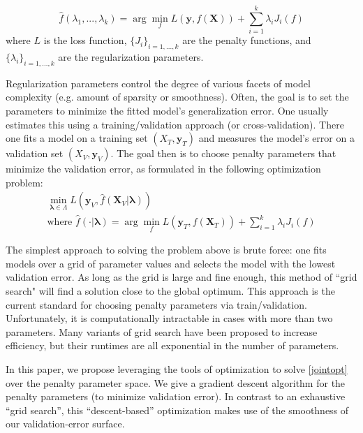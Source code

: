 \documentclass[10pt,letterpaper]{article}
\begin{document}
\begin{equation} \label {eq:basic}
\hat f(\lambda_1, ..., \lambda_k) = \arg \min_f L(\boldsymbol{y}, f (\boldsymbol{X})) + \sum\limits_{i=1}^k \lambda_i J_i(f)
\end{equation}
where $L$ is the loss function, $\{J_i\}_{i=1, ..., k}$ are the penalty functions, and $\{\lambda_i\}_{i=1, ..., k}$ are the regularization parameters.

Regularization parameters control the degree of various facets of model complexity (e.g. amount of sparsity or smoothness). Often, the goal is to set the parameters to minimize the fitted model's generalization error. One usually estimates this using a training/validation approach (or cross-validation). There one fits a model on a training set $(X_T, \boldsymbol y_T)$ and measures the model's error on a validation set $(X_V, \boldsymbol y_V)$. The goal then is to choose penalty parameters that minimize the validation error, as formulated in the following optimization problem:
\begin{equation}
\begin{array}{c}
\min_{\boldsymbol{\lambda} \in \Lambda} L(\boldsymbol{y}_V, \hat f (\boldsymbol{X}_V | \boldsymbol{\lambda})) \\
\text{where } \hat f(\cdot | \boldsymbol{\lambda}) = \arg \min_f L(\boldsymbol{y}_T, f (\boldsymbol{X}_T)) + \sum\limits_{i=1}^k \lambda_i J_i(f)
\end{array}
\label{jointopt}
\end{equation}

The simplest approach to solving the problem above is brute force: one fits models over a grid of parameter values and selects the model with the lowest validation error. As long as the grid is large and fine enough, this method of ``grid search" will find a solution close to the global optimum. This approach is the current standard for choosing penalty parameters via train/validation. Unfortunately, it is computationally intractable in cases with more than two parameters. Many variants of grid search have been proposed to increase efficiency, but their runtimes are all exponential in the number of parameters.

In this paper, we propose leveraging the tools of optimization to solve \eqref{jointopt} over the penalty parameter space. We give a gradient descent algorithm for the penalty parameters (to minimize validation error). In contrast to an exhaustive ``grid search'', this ``descent-based'' optimization makes use of the smoothness of our validation-error surface. 
\end{document}
